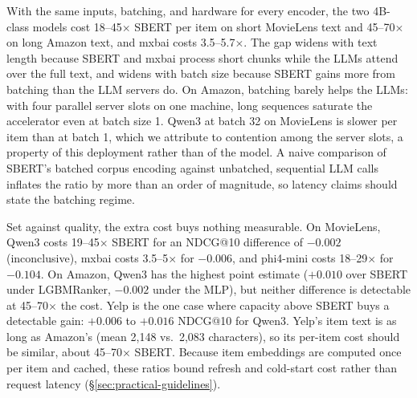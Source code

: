 With the same inputs, batching, and hardware for every encoder, the
two 4B-class models cost 18--45$\times$ SBERT per item on short
MovieLens text and 45--70$\times$ on long Amazon text, and mxbai costs
3.5--5.7$\times$. The gap widens with text length because SBERT and
mxbai process short chunks while the LLMs attend over the full text,
and widens with batch size because SBERT gains more from batching
than the LLM servers do. On Amazon, batching barely helps the LLMs:
with four parallel server slots on one machine, long sequences
saturate the accelerator even at batch size 1. Qwen3 at batch 32 on
MovieLens is slower per item than at batch 1, which we attribute to
contention among the server slots, a property of this deployment
rather than of the model. A naive comparison of SBERT's batched corpus
encoding against unbatched, sequential LLM calls inflates the ratio by
more than an order of magnitude, so latency claims should state the
batching regime.

Set against quality, the extra cost buys nothing measurable. On
MovieLens, Qwen3 costs 19--45$\times$ SBERT for an NDCG@10 difference of
$-0.002$ (inconclusive), mxbai costs 3.5--5$\times$ for $-0.006$, and
phi4-mini costs 18--29$\times$ for $-0.104$. On Amazon, Qwen3 has the
highest point estimate ($+0.010$ over SBERT under LGBMRanker, $-0.002$
under the MLP), but neither difference is detectable at 45--70$\times$
the cost. Yelp is the one case where capacity above SBERT buys a
detectable gain: $+0.006$ to $+0.016$ NDCG@10 for Qwen3. Yelp's item text
is as long as Amazon's (mean 2{,}148 vs.\ 2{,}083 characters), so its
per-item cost should be similar, about 45--70$\times$ SBERT. Because item embeddings are computed once per item and
cached, these ratios bound refresh and cold-start cost rather than
request latency (\S\ref{sec:practical-guidelines}).
